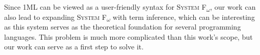 \documentclass{spbau-diploma}
\begin{document}
Since \textsc{1ML} can be viewed as a user-friendly syntax for \textsc{System F\textsubscript{$\omega$}}, our work can also lead to expanding \textsc{System F\textsubscript{$\omega$}} with term inference, which can be interesting as this system serves as the theoretical foundation for several programming languages. This problem is much more complicated than this work's scope, but our work can serve as a first step to solve it.



\end{document}
